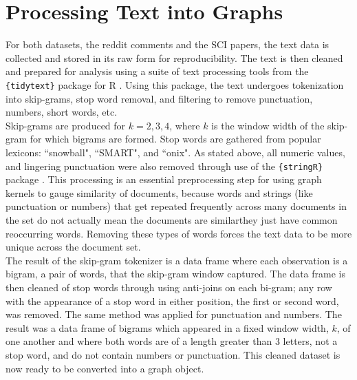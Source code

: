 %
%
%

\section{Processing Text into Graphs}

\hspace*{0.3cm} For both datasets, the reddit comments and the SCI papers, the text data is collected and stored in its raw form for reproducibility. The text is then cleaned and prepared for analysis using a suite of text processing tools from the \texttt{\{tidytext\}} package for R \cite{silge2016tidytext}. Using this package, the text undergoes tokenization into skip-grams, stop word removal, and filtering to remove punctuation, numbers, short words, etc. \\

Skip-grams are produced for $k=2,3,4$, where $k$ is the window width of the skip-gram for which bigrams are formed. Stop words are gathered from popular lexicons: ``snowball", ``SMART", and ``onix". As stated above, all numeric values, and lingering punctuation were also removed through use of the \texttt{\{stringR\}} package \cite{wickham2010stringr}. This processing is an essential preprocessing step for using graph kernels to gauge similarity of documents, because words and strings (like punctuation or numbers) that get repeated frequently across many documents in the set do not actually mean the documents are similar\textemdash they just have common reoccurring words. Removing these types of words forces the text data to be more unique across the document set.  \\

The result of the skip-gram tokenizer is a data frame where each observation is a bigram, a pair of words, that the skip-gram window captured. The data frame is then cleaned of stop words through using anti-joins on each bi-gram; any row with the appearance of a stop word in either position, the first or second word, was removed. The same method was applied for punctuation and numbers. The result was a data frame of bigrams which appeared in a fixed window width, $k$, of one another and where both words are of a length greater than 3 letters, not a stop word, and do not contain numbers or punctuation. This cleaned dataset is now ready to be converted into a graph object. \\

